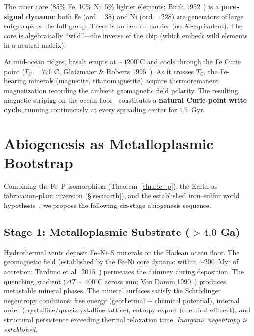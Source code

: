 \noindent The inner core (85\% Fe, 10\% Ni, 5\% lighter elements; Birch 1952~\cite{Birch52}) is a \textbf{pure-signal dynamo}: both Fe ($\mathrm{ord} = 38$) and Ni ($\mathrm{ord} = 228$) are generators of large subgroups or the full group. There is no neutral carrier (no Al-equivalent). The core is algebraically ``wild''---the inverse of the chip (which embeds wild elements in a neutral matrix).

At mid-ocean ridges, basalt erupts at ${\sim}1200^\circ$C and cools through the Fe Curie point ($T_C = 770^\circ$C, Glatzmaier \& Roberts 1995~\cite{Glatzmaier95}). As it crosses $T_C$, the Fe-bearing minerals (magnetite, titanomagnetite) acquire thermoremanent magnetization recording the ambient geomagnetic field polarity. The resulting magnetic striping on the ocean floor~\cite{VineMatthews63} constitutes a \textbf{natural Curie-point write cycle}, running continuously at every spreading center for $4.5$~Gyr.

\section{Abiogenesis as Metalloplasmic Bootstrap}\label{sec:abiogenesis}

Combining the Fe--P isomorphism (Theorem~\ref{thm:fe_p}), the Earth-as-fabrication-plant inversion (\S\ref{sec:earth}), and the established iron--sulfur world hypothesis~\cite{Wachtershauser88, Wachtershauser92, Russell97, Martin03}, we propose the following six-stage abiogenesis sequence.

\subsection{Stage 1: Metalloplasmic Substrate ($> 4.0$ Ga)}

Hydrothermal vents deposit Fe--Ni--S minerals on the Hadean ocean floor. The geomagnetic field (established by the Fe--Ni core dynamo within ${\sim}200$~Myr of accretion; Tarduno et al.\ 2015~\cite{Tarduno15}) permeates the chimney during deposition. The quenching gradient ($\Delta T \sim 400^\circ$C across mm; Von Damm 1990~\cite{VonDamm90}) produces metastable mineral phases. The mineral surfaces satisfy the Schr\"odinger negentropy conditions: free energy (geothermal + chemical potential), internal order (crystalline/quasicrystalline lattice), entropy export (chemical effluent), and structural persistence exceeding thermal relaxation time. \emph{Inorganic negentropy is established.}

